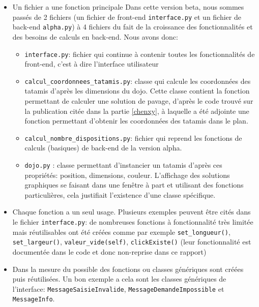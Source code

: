 \begin{itemize}
    \item Un fichier a une fonction principale
          Dans cette version beta, nous sommes passés de 2 fichiers (un fichier de front-end \texttt{interface.py} et un fichier de back-end \texttt{alpha.py}) à
          4 fichiers du fait de la croissance des fonctionnalités et des besoins de calculs en back-end. Nous avons donc:
          \begin{itemize}
              \item \texttt{interface.py}: fichier qui continue à contenir toutes les fonctionnalités de front-end, c’est à dire l’interface utilisateur
              \item \texttt{calcul\_coordonnees\_tatamis.py}: classe qui calcule les coordonnées des tatamis d'après les dimensions du dojo.
                    Cette classe contient la fonction permettant de calculer une solution de pavage, d’après le code trouvé sur la publication
                    citée dans la partie \ref{chenxy}, à laquelle a été adjointe une fonction permettant d’obtenir les coordonnées des tatamis dans le plan.
              \item \texttt{calcul\_nombre\_dispositions.py}: fichier qui reprend les fonctions de calculs (basiques) de back-end de la version alpha.
              \item \texttt{dojo.py} : classe permettant d'instancier un tatamis d'après ces propriétés: position, dimensions, couleur. L’affichage
                    des solutions graphiques se faisant dans une fenêtre à part et utilisant des fonctions particulières, cela justifiait
                    l’existence d’une classe spécifique.
          \end{itemize}
    \item Chaque fonction a un seul usage. Plusieurs exemples peuvent être cités dans le fichier \texttt{interface.py}: de nombreuses
          fonctions à fonctionnalité très limitée mais réutilisables ont été créées comme par exemple \texttt{set\_longueur()}, \texttt{set\_largeur()}, 
          \texttt{valeur\_vide(self)}, \texttt{clickExiste()} (leur fonctionnalité est documentée dans le code et donc non-reprise dans ce rapport)

    \item Dans la mesure du possible des fonctions ou classes génériques sont créées puis réutilisées.
          Un bon exemple a cela sont les classes génériques de l’interface: \texttt{MessageSaisieInvalide}, \texttt{MessageDemandeImpossible} et \texttt{MessageInfo}.
\end{itemize}



